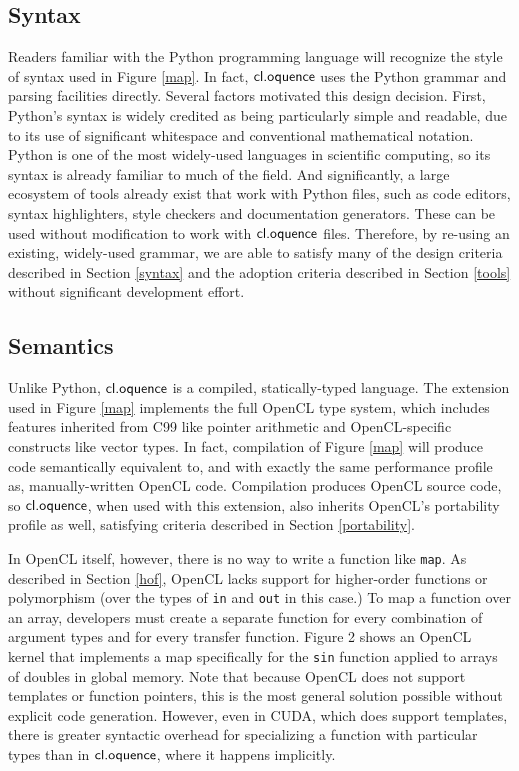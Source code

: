\documentclass{llncs}
\begin{document}
\subsection{Syntax}
Readers familiar with the Python programming language will recognize the style of syntax used in Figure \ref{map}. In fact, $\textsf{cl.oquence}$ uses the Python grammar and parsing facilities directly. Several factors motivated this design decision. First, Python's syntax is widely credited as being particularly simple and readable, due to its use of significant whitespace and conventional mathematical notation. Python is one of the most widely-used languages in scientific computing, so its syntax is already familiar to much of the field. And significantly, a large ecosystem of tools already exist that work with Python files, such as code editors, syntax highlighters, style checkers and documentation generators. These can be used without modification to work with $\textsf{cl.oquence}$ files. Therefore, by re-using an existing, widely-used grammar, we are able to satisfy many of the design criteria described in Section \ref{syntax} and the adoption criteria described in Section \ref{tools} without significant development effort.

\subsection{Semantics}
Unlike Python, $\textsf{cl.oquence}$ is a compiled, statically-typed language. The extension used in Figure \ref{map} implements the full OpenCL type system, which includes features inherited from C99 like pointer arithmetic and OpenCL-specific constructs like vector types. In fact, compilation of Figure \ref{map} will produce code semantically equivalent to, and with exactly the same performance profile as, manually-written OpenCL code. Compilation produces OpenCL source code, so $\textsf{cl.oquence}$, when used with this extension, also inherits OpenCL's portability profile as well, satisfying criteria described in Section \ref{portability}.

In OpenCL itself, however, there is no way to write a function like \verb|map|. As described in Section \ref{hof}, OpenCL lacks support for higher-order functions or polymorphism (over the types of \verb|in| and \verb|out| in this case.) To map a function over an array, developers must create a separate function for every combination of argument types and for every transfer function. Figure 2 shows an OpenCL kernel that implements a map specifically for the \verb|sin| function applied to arrays of doubles in global memory. Note that because OpenCL does not support templates or function pointers, this is the most general solution possible without explicit code generation. However, even in CUDA, which does support templates, there is greater syntactic overhead for specializing a function with particular types than in $\textsf{cl.oquence}$, where it happens implicitly.
\end{document}
